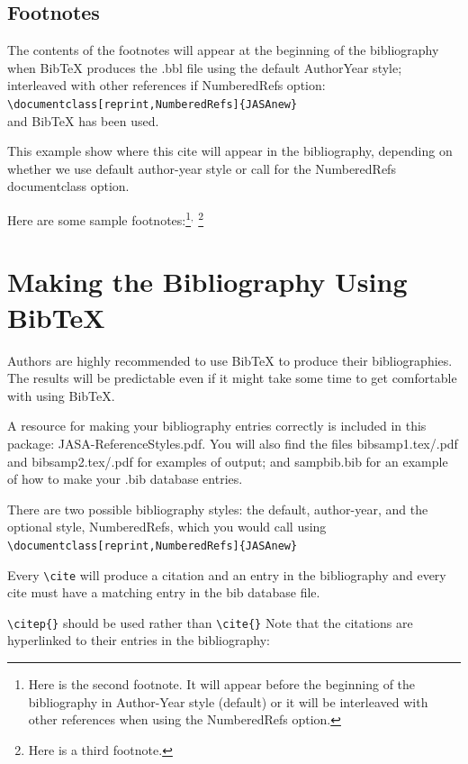 \documentclass[reprint]{JASAnew}
\begin{document}
\subsection{Footnotes}
The contents of the footnotes will appear at the beginning of the
bibliography when BibTeX produces the .bbl file using the default
AuthorYear style; interleaved with other references if 
Numbered\-Refs option:\\
\verb+\documentclass[reprint,NumberedRefs]{JASAnew}+\\
and BibTeX has been used.

This example show where this cite \citep{booksamp1} will appear in the
bibliography,
depending on whether we use default author-year style
or call for the NumberedRefs documentclass option.

Here are some sample footnotes:\footnote{Here is the second footnote.
It will appear before the beginning of the bibliography in Author-Year
style (default) or it will be 
 interleaved with other references when using the Numbered\-Refs
 option.}$^,$%
\footnote{Here is a third footnote.}


\section{Making the Bibliography Using BibTeX}
Authors are highly  recommended to use BibTeX to produce their
bibliographies. The results will be predictable
 even if
it might take some time to get comfortable with  using BibTeX.

A resource for making your bibliography entries
correctly is included in this package: 
JASA-ReferenceStyles.pdf. You will also find
the files
bibsamp1.tex/.pdf and bibsamp2.tex/.pdf
for examples of output; and sampbib.bib for an example of
how to make your .bib database entries.

There are two possible bibliography styles: the default, author-year,
and the optional style, Numbered\-Refs, which you would call using\\
{\verb+\documentclass[reprint,NumberedRefs]{JASAnew}+ }

Every \verb+\cite+ will produce a citation and an entry in the
bibliography and every cite must have a matching entry in the bib
database file.

\verb+\citep{}+ should be used rather than \verb+\cite{}+
Note that the citations are hyperlinked to their entries in the
bibliography:
\end{document}
